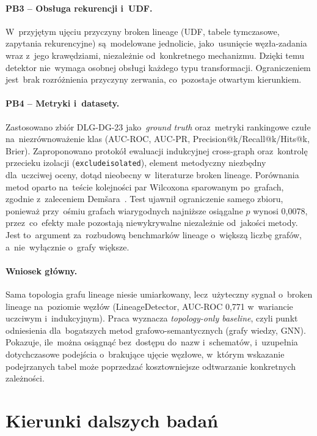 \documentclass[polish,master,a4paper,oneside]{ppfcmthesis}
\renewcommand{\_}{\origtextunderscore\ifmmode\else\allowbreak\fi}
\begin{document}
\paragraph{PB3 – Obsługa rekurencji i~UDF.}
W~przyjętym ujęciu przyczyny broken lineage (UDF, tabele tymczasowe, zapytania
rekurencyjne) są~modelowane jednolicie, jako~usunięcie węzła-zadania wraz
z~jego krawędziami, niezależnie od~konkretnego mechanizmu. Dzięki temu
detektor nie~wymaga osobnej obsługi każdego typu transformacji. Ograniczeniem
jest~brak rozróżnienia przyczyny zerwania, co~pozostaje otwartym kierunkiem.

\paragraph{PB4 – Metryki i~datasety.}
Zastosowano zbiór DLG-DG-23 jako~\emph{ground truth} oraz~metryki rankingowe
czułe na~niezrównoważenie klas (AUC-ROC, AUC-PR, Precision@k/Recall@k/Hits@k,
Brier). Zaproponowano protokół ewaluacji indukcyjnej cross-graph
oraz~kontrolę przecieku izolacji (\texttt{exclude\_isolated}), element
metodyczny niezbędny dla~uczciwej oceny, dotąd nieobecny w~literaturze broken
lineage. Porównania metod oparto na~teście kolejności par Wilcoxona sparowanym
po~grafach, zgodnie z~zaleceniem Demšara~\cite{Demsar2006}. Test ujawnił
ograniczenie samego zbioru, ponieważ przy~ośmiu grafach wiarygodnych najniższe osiągalne
$p$ wynosi 0{,}0078, przez~co~efekty małe pozostają niewykrywalne niezależnie
od~jakości metody. Jest to~argument za~rozbudową benchmarków lineage o~większą
liczbę grafów, a~nie~wyłącznie o~grafy większe.

\paragraph{Wniosek główny.}
Sama topologia grafu lineage niesie umiarkowany, lecz~użyteczny sygnał
o~broken lineage na~poziomie węzłów (LineageDetector, AUC-ROC 0{,}771
w~wariancie uczciwym i~indukcyjnym). Praca wyznacza \emph{topology-only baseline}, czyli punkt odniesienia
dla~bogatszych metod grafowo-semantycznych (grafy wiedzy, GNN). Pokazuje,
ile~można osiągnąć bez~dostępu do~nazw i~schematów, i~uzupełnia dotychczasowe
podejścia o~brakujące ujęcie węzłowe, w~którym wskazanie podejrzanych tabel może
poprzedzać kosztowniejsze odtwarzanie konkretnych zależności.

\section{Kierunki dalszych badań}
\label{sec:dalsze_badania}
\end{document}
